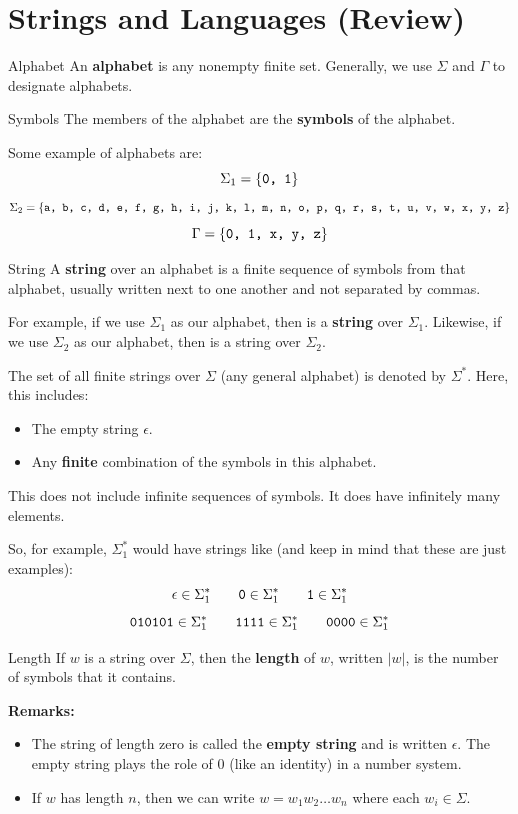 \documentclass[letterpaper]{article}
\begin{document}
\newpage
{}

\section{Strings and Languages (Review)}
\begin{definition}{Alphabet}{}
    An \textbf{alphabet} is any nonempty finite set. Generally, we use $\Sigma$ and $\Gamma$ to designate alphabets.
\end{definition}

\begin{definition}{Symbols}{}
    The members of the alphabet are the \textbf{symbols} of the alphabet.
\end{definition}

Some example of alphabets are: 
\[\Sigma_1 = \{\texttt{0, 1}\}\]
\[\Sigma_2 = \{\texttt{a, b, c, d, e, f, g, h, i, j, k, l, m, n, o, p, q, r, s, t, u, v, w, x, y, z}\}\]
\[\Gamma = \{\texttt{0, 1, x, y, z}\}\]

\begin{definition}{String}{}
    A \textbf{string} over an alphabet is a finite sequence of symbols from that alphabet, usually written next to one another and not separated by commas. 
\end{definition}
For example, if we use $\Sigma_1$ as our alphabet, then  is a \textbf{string} over $\Sigma_1$. Likewise, if we use $\Sigma_2$ as our alphabet, then  is a string over $\Sigma_2$. 

\bigskip

The set of all finite strings over $\Sigma$ (any general alphabet) is denoted by $\Sigma^*$. Here, this includes:
\begin{itemize}
    \item The empty string $\epsilon$.
    \item Any \textbf{finite} combination of the symbols in this alphabet.
\end{itemize}
This does not include infinite sequences of symbols. It does have infinitely many elements. 

\bigskip

So, for example, $\Sigma_{1}^{*}$ would have strings like (and keep in mind that these are just examples): 
\[\epsilon \in \Sigma_{1}^{*} \qquad \texttt{0} \in \Sigma_{1}^{*} \qquad \texttt{1} \in \Sigma_{1}^{*}\]
\[\texttt{010101} \in \Sigma_{1}^{*} \qquad \texttt{1111} \in \Sigma_{1}^{*} \qquad \texttt{0000} \in \Sigma_{1}^{*}\]

\begin{definition}{Length}{}
    If $w$ is a string over $\Sigma$, then the \textbf{length} of $w$, written $|w|$, is the number of symbols that it contains. 
\end{definition}
\textbf{Remarks:}
\begin{itemize}
    \item The string of length zero is called the \textbf{empty string} and is written $\epsilon$. The empty string plays the role of 0 (like an identity) in a number system.
    \item If $w$ has length $n$, then we can write $w = w_1 w_2 \dots w_n$ where each $w_i \in \Sigma$.
\end{itemize} 
\end{document}
